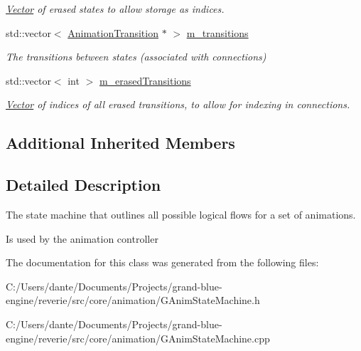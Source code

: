 \begin{Indent}
\begin{DoxyCompactItemize}
\begin{DoxyCompactList}\small\item\em \mbox{\hyperlink{classrev_1_1_vector}{Vector}} of erased states to allow storage as indices. \end{DoxyCompactList}\item 
\mbox{\label{classrev_1_1_animation_state_machine_a8f6a889d91905da3dd439c94c51df9cc}} 
std\+::vector$<$ \mbox{\hyperlink{classrev_1_1_animation_transition}{Animation\+Transition}} $\ast$ $>$ \mbox{\hyperlink{classrev_1_1_animation_state_machine_a8f6a889d91905da3dd439c94c51df9cc}{m\+\_\+transitions}}
\begin{DoxyCompactList}\small\item\em The transitions between states (associated with connections) \end{DoxyCompactList}\item 
\mbox{\label{classrev_1_1_animation_state_machine_a1af9f7699e2e6e61858cce71554638b1}} 
std\+::vector$<$ int $>$ \mbox{\hyperlink{classrev_1_1_animation_state_machine_a1af9f7699e2e6e61858cce71554638b1}{m\+\_\+erased\+Transitions}}
\begin{DoxyCompactList}\small\item\em \mbox{\hyperlink{classrev_1_1_vector}{Vector}} of indices of all erased transitions, to allow for indexing in connections. \end{DoxyCompactList}\end{DoxyCompactItemize}
\end{Indent}
\subsection*{Additional Inherited Members}


\subsection{Detailed Description}
The state machine that outlines all possible logical flows for a set of animations. 

Is used by the animation controller 

The documentation for this class was generated from the following files\+:\begin{DoxyCompactItemize}
\item 
C\+:/\+Users/dante/\+Documents/\+Projects/grand-\/blue-\/engine/reverie/src/core/animation/G\+Anim\+State\+Machine.\+h\item 
C\+:/\+Users/dante/\+Documents/\+Projects/grand-\/blue-\/engine/reverie/src/core/animation/G\+Anim\+State\+Machine.\+cpp\end{DoxyCompactItemize}
